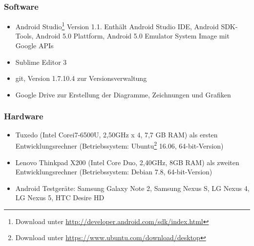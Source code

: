 \subsubsection{Software}
\begin{itemize}
	\item Android Studio\footnote{ Download unter \url{http://developer.android.com/sdk/index.html}} Version 1.1. Enthält Android Studio IDE, Android \gls{SDK}-Tools, Android 5.0 Plattform, Android 5.0 Emulator System Image mit Google \glspl{API}
	\item Sublime Editor 3
	\item git, Version 1.7.10.4 zur Versionsverwaltung
	\item Google Drive zur Erstellung der Diagramme, Zeichnungen und Grafiken
\end{itemize}
\subsubsection{Hardware}
\begin{itemize}
	\item Tuxedo  (Intel\textsuperscript{\textregistered} Core\texttrademark   i7-6500U, 2,50GHz x 4, 7,7 GB RAM) als ersten Entwicklungsrechner (Betriebssystem: Ubuntu\footnote{ Download unter \url{https://www.ubuntu.com/download/desktop}} 16.06, 64-bit-Version)
	\item Lenovo Thinkpad X200 (Intel\textsuperscript{\textregistered} Core Duo, 2,40GHz, 8GB RAM) als zweiten Entwicklungsrechner (Betriebssystem: Debian 7.8, 64-bit-Version)
	\item Android Testgeräte: Samsung Galaxy Note 2, Samsung Nexus S, LG Nexus 4, LG Nexus 5, HTC Desire HD
\end{itemize}
